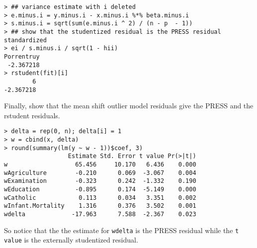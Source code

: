 \begin{verbatim}
> ## variance estimate with i deleted
> e.minus.i = y.minus.i - x.minus.i %*% beta.minus.i
> s.minus.i = sqrt(sum(e.minus.i ^ 2) / (n - p  - 1))
> ## show that the studentized residual is the PRESS residual standardized
> ei / s.minus.i / sqrt(1 - hii)
Porrentruy 
 -2.367218 
> rstudent(fit)[i]
        6 
-2.367218 
\end{verbatim}
Finally, show that the mean shift outlier model residuals give the PRESS and
the rstudent residuals.
\begin{verbatim}
> delta = rep(0, n); delta[i] = 1
> w = cbind(x, delta)
> round(summary(lm(y ~ w - 1))$coef, 3)
                  Estimate Std. Error t value Pr(>|t|)
w                   65.456     10.170   6.436    0.000
wAgriculture        -0.210      0.069  -3.067    0.004
wExamination        -0.323      0.242  -1.332    0.190
wEducation          -0.895      0.174  -5.149    0.000
wCatholic            0.113      0.034   3.351    0.002
wInfant.Mortality    1.316      0.376   3.502    0.001
wdelta             -17.963      7.588  -2.367    0.023
\end{verbatim}
So notice that the the estimate for \texttt{wdelta} is the PRESS residual
while the \texttt{t value} is the externally studentized residual.
